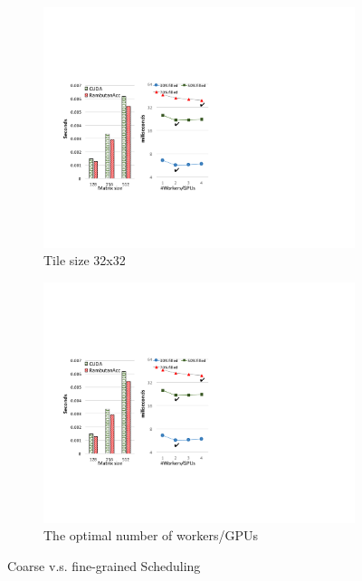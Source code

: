 \begin{figure}[htb]
\centering
\begin{subfigure}{0.23\textwidth}
\includegraphics[width=\textwidth]{figures/choleskyScheResults.pdf}
\caption{Tile size 32x32}
\label{choleskySche}
\end{subfigure}
\begin{subfigure}{0.23\textwidth}
\includegraphics[width=\textwidth]{figures/nWorkers.pdf}
\caption{The optimal number of workers/GPUs}
\label{fig:nWorkers}
\end{subfigure}
\caption{Coarse v.s. fine-grained Scheduling}
\label{fig:coarseFine}
\end{figure}


